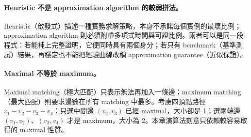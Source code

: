 \documentclass[11pt,a4paper,oneside,openany]{book}
\begin{document}
\paragraph{Heuristic 不是 approximation algorithm 的較弱拼法。}
Heuristic（啟發式）描述一種實務求解策略，本身不承諾每個實例的最壞比例；approximation algorithm 則必須附帶多項式時間與可證比例。兩者可以是同一段程式：若能補上完整證明，它便同時具有兩個身分；若只有 benchmark（基準測試）結果，再穩定也不能把經驗曲線改稱 approximation guarantee（近似保證）。

\paragraph{Maximal 不等於 maximum。}
Maximal matching（極大匹配）只表示無法再加入一條邊；maximum matching（最大匹配）則要求邊數在所有 matching 中最多。考慮四頂點路徑 $v_1-v_2-v_3-v_4$：只選中間邊 $(v_2,v_3)$ 已經 maximal，大小卻是 1；選兩端邊 $(v_1,v_2)$、$(v_3,v_4)$ 才是 maximum，大小為 2。本章演算法刻意只依賴較容易取得的 maximal 性質。
\end{document}
